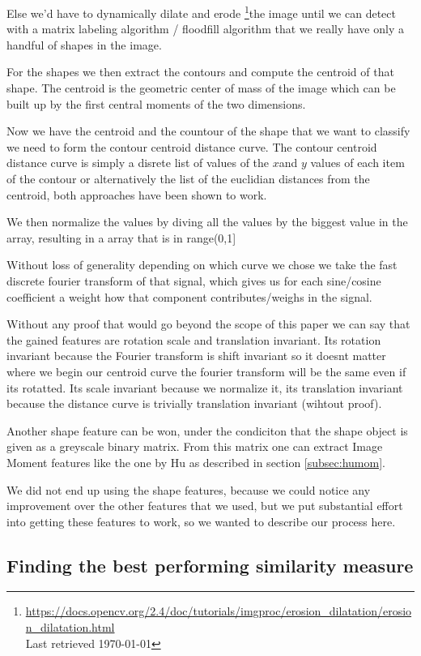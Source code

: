 \documentclass[journal]{vgtc}       %
\begin{document}
Else we'd have to dynamically dilate and erode \footnote{\url{https://docs.opencv.org/2.4/doc/tutorials/imgproc/erosion_dilatation/erosion_dilatation.html}\\ Last retrieved \today}the image until we can detect with a matrix labeling algorithm /  floodfill algorithm that we really have only a handful of shapes in the image.

For the shapes we then extract the contours and compute the centroid of that shape.
The centroid is the geometric center of mass of the image which can be built up by the first central moments of the two dimensions.

Now we have the centroid and the countour of the shape that we want to classify we need to form the contour centroid distance curve.
The contour centroid distance curve is simply a disrete list of values of the \(x\)and \(y\)  values of each item of the contour  or alternatively the list of the euclidian  distances from the centroid, both approaches have been shown to work.

We then normalize the values by diving all the values by the biggest value in the array, resulting in a array that is in range(0,1]

Without loss of generality depending on which curve we chose we take the fast discrete fourier transform of that signal, which gives us for each sine/cosine coefficient a weight how that component contributes/weighs in the signal.

Without any proof that would go beyond the scope of this paper we can say that the gained features are rotation scale and translation invariant. Its rotation invariant because the Fourier transform is shift invariant so it doesnt matter where we begin our centroid curve the fourier transform will be the same even if its rotatted. Its scale invariant because we normalize it, its translation invariant because the distance curve is trivially translation invariant (wihtout proof).

Another shape feature can be won, under the condiciton that the shape object is given as a greyscale binary matrix. From this matrix one can extract Image Moment features like the one by Hu as described in section \ref{subsec:humom}.

We did not end up using the shape features, because we could notice any improvement over the other features that we used, but we put substantial effort into getting these features to work, so we wanted to describe our process here.

\subsection{Finding the best performing similarity measure}\label{subsec:simmes}
\end{document}

